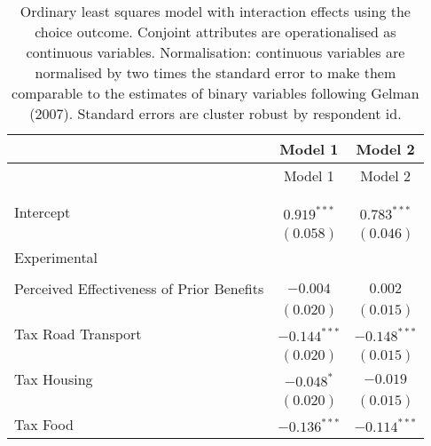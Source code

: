 
\begin{center}
\begin{tiny}
\begin{longtable}{l@{} c@{} c@{}}
\hline
 & Model 1 & Model 2 \\
\hline
\endfirsthead
\hline
 & Model 1 & Model 2 \\
\hline
\endhead
\hline
\endfoot
\hline
\multicolumn{3}{l}{\tiny{$^{***}p<0.001$; $^{**}p<0.01$; $^{*}p<0.05$; $^{\cdot}p<0.1$}}\\
\caption{Ordinary least squares model with interaction effects using the choice outcome. Conjoint attributes are operationalised as continuous variables. Normalisation: continuous variables are normalised by two times
               the standard error to make them comparable to the estimates of binary variables following Gelman (2007). Standard errors are cluster robust by respondent id.}
\label{table:linear_interactions_exp_continuous_choice}
\endlastfoot \\
Intercept                                                                  & $0.919^{***}$   & $0.783^{***}$  \\
                                                                           & $(0.058)$       & $(0.046)$      \\
Experimental                                                               &                 &                \\
                                                                           &                 &                \\
\quad Perceived Effectiveness of Prior Benefits                            & $-0.004$        & $0.002$        \\
                                                                           & $(0.020)$       & $(0.015)$      \\
\quad Tax Road Transport                                                   & $-0.144^{***}$  & $-0.148^{***}$ \\
                                                                           & $(0.020)$       & $(0.015)$      \\
\quad Tax Housing                                                          & $-0.048^{*}$    & $-0.019$       \\
                                                                           & $(0.020)$       & $(0.015)$      \\
\quad Tax Food                                                             & $-0.136^{***}$  & $-0.114^{***}$ \\

\end{longtable}
\end{tiny}
\end{center}
